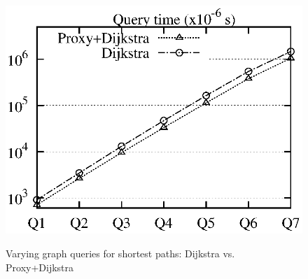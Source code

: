 \begin{figure}[t!]
\begin{center}
{\includegraphics[scale=0.45]{./exp/query_eus_path_dj.eps}}
\hspace{-4ex}\vspace{-1.5ex}
\end{center}
\vspace{1ex}
\caption{Varying graph queries for shortest paths: Dijkstra vs. Proxy+Dijkstra}
\label{fig:performance_path_queries_dj}
\vspace{-1ex}
\end{figure}
